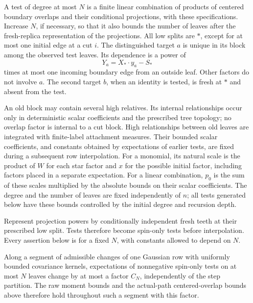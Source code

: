 \begin{definition}\label{def:cavity-tests}
A test of degree at most \(N\) is a finite linear combination of
products of centered boundary overlaps and their conditional
projections, with these specifications. Increase \(N\), if necessary,
so that it also bounds the number of leaves after the fresh-replica
representation of the projections. All low splits are \(*\),
except for at most one initial edge at a cut \(i\).
The distinguished target \(a\) is unique in its block among the
observed test leaves. Its dependence is a power of
\[
                         Y_a=X_*\cdot y_a-S_*
\]
times at most one incoming boundary edge from an outside leaf.
Other factors do not involve \(a\). The second target \(b\), when
an identity is tested, is fresh at \(*\) and absent from the test.

An old block may contain several high relatives. Its internal
relationships occur only in deterministic scalar coefficients and
the prescribed tree topology; no overlap factor is internal to a
cut block. High relationships between old leaves are integrated
with finite-label attachment measures. Their bounded scalar
coefficients, and constants obtained by expectations of earlier
tests, are fixed during a subsequent row interpolation.
For a monomial, its natural scale is the product of \(W\) for each
star factor and \(x\) for the possible initial factor, including
factors placed in a separate expectation. For a linear combination,
\(p_0\) is the sum of these scales multiplied by the absolute bounds
on their scalar coefficients. The degree and the number of leaves
are fixed independently of \(n\); all tests generated below have
these bounds controlled by the initial degree and recursion depth.
\end{definition}

Represent projection powers by conditionally independent fresh
teeth at their prescribed low split. Tests therefore become
spin-only tests before interpolation. Every assertion below is for
a fixed \(N\), with constants allowed to depend on \(N\).

\begin{lemma}\label{lem:cavity-row-change}
Along a segment of admissible changes of one Gaussian row with
uniformly bounded covariance kernels, expectations of nonnegative
spin-only tests on at most \(N\) leaves change by at most a factor
\(C_N\), independently of the step partition. The raw moment
bounds and the actual-path centered-overlap bounds above therefore
hold throughout such a segment with this factor.
\end{lemma}

